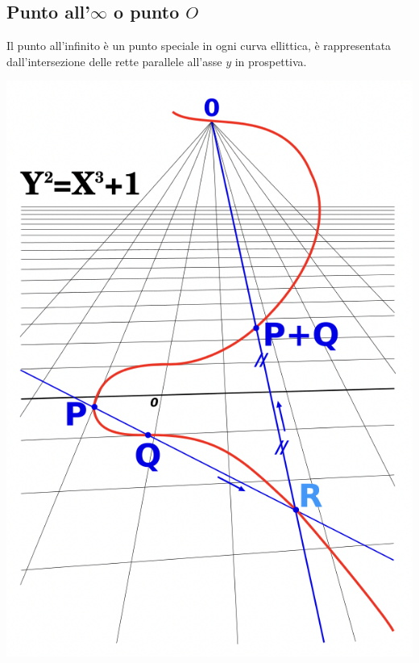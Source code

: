 \documentclass[11pt, oneside]{article}   	%
\begin{document}
\subsection*{Punto all'$\infty$ o punto $O$}
Il punto all'infinito è un punto speciale in ogni curva ellittica, è rappresentata dall'intersezione delle rette parallele all'asse $y$ in prospettiva.
\begin{center}
\includegraphics[scale= 0.4]{pzero}
\end{center}
\end{document}
